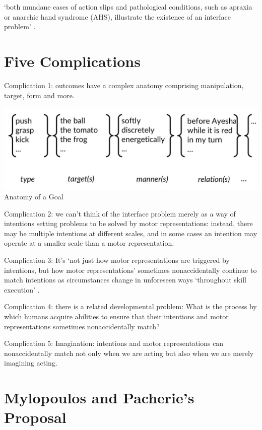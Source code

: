 \documentclass[12pt]{extarticle}
\begin{document}
\begin{multicols*}{3}
‘both mundane cases of action slips and pathological conditions, such as apraxia or anarchic hand
syndrome (AHS), illustrate the existence of an interface problem’ 
\citep[p.~7]{mylopoulos:2016_intentions}.
 
 
 
\section{Five Complications}

Complication 1: outcomes have a complex anatomy
comprising manipulation, target, form and more.

\begin{center}
    
  \includegraphics[scale=0.3]{fig/anatomy_of_a_goal.jpg}
  Anatomy of a Goal
  \end{center}
  
Complication 2: we can’t think of the interface problem merely as a way of intentions
setting problems to be solved by motor representations: instead, there may be multiple intentions
at different scales, and in some cases an intention may operate at a smaller scale than
a motor representation.

Complication 3: It’s ‘not just how motor representations are triggered by intentions, but how motor
representations’ sometimes nonaccidentally continue to match intentions as circumstances change in unforeseen ways ‘throughout
skill execution’
\citep[p.~19]{fridland:2016_skill}.
 
 Complication 4: there is a related developmental problem: What is the process by which humans acquire
 abilities to ensure that their intentions and motor representations sometimes nonaccidentally
 match?

 Complication 5: Imagination: intentions and motor representations can nonaccidentally match not only
 when we are acting but also when we are merely imagining acting.
 
\section{Mylopoulos and Pacherie’s Proposal}
 

\end{multicols*}
\end{document}
